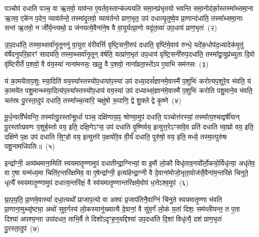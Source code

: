 पञ्चोप॑ दधाति पञ्च॒ वा ऋ॒तवो॒ याव॑न्त ए॒वर्तव॒स्तान्क॑ल्पयति समा॒नप्र॑भृतयो भवन्ति समा॒नोद॑र्का॒स्तस्मा᳚थ्समा॒ना ऋ॒तव॒ एके॑न प॒देन॒ व्याव॑र्तन्ते॒ तस्मा॑दृ॒तवो॒ व्याव॑र्तन्ते प्राण॒भृत॒ उप॑ दधात्यृ॒तुष्वे॒व प्रा॒णान्द॑धाति॒ तस्मा᳚थ्समा॒नाः सन्त॑ ऋ॒तवो॒ न जी᳚र्य॒न्त्यथो॒ प्र ज॑नयत्ये॒वैना॑ने॒ष वै वा॒युर्यत्प्रा॒णो यदृ॑त॒व्या॑ उप॒धाय॑ प्राण॒भृतः॑~(२)

उ॒प॒दधा॑ति॒ तस्मा॒थ्सर्वा॑नृ॒तूननु॑ वा॒युरा व॑रीवर्त्ति वृष्टि॒सनी॒रुप॑ दधाति॒ वृष्टि॑मे॒वाव॑ रुन्धे॒ यदे॑क॒धोप॑द॒ध्यादेक॑मृ॒तुं व॑र्\mbox{}षेदनुपरि॒हारꣳ॑ सादयति॒ तस्मा॒थ्सर्वा॑नृ॒तून् व॑र्\mbox{}षति॒ यत्प्रा॑ण॒भृत॑ उप॒धाय॑ वृष्टि॒सनी॑रुप॒दधा॑ति॒ तस्मा᳚द्वा॒युप्र॑च्युता दि॒वो वृ॑ष्टिरीर्ते प॒शवो॒ वै व॑य॒स्या॑ नाना॑मनसः॒ खलु॒ वै प॒शवो॒ नाना᳚व्रता॒स्ते॑\-ऽप ए॒वाभि सम॑नसः~(३)

यं का॒मये॑ताप॒शुः स्या॒दिति॑ वय॒स्या᳚स्तस्यो॑प॒धाया॑प॒स्या॑ उप॑ दध्या॒दसं᳚ज्ञानमे॒वास्मै॑ प॒शुभिः॑ करोत्यप॒शुरे॒व भ॑वति॒ यं का॒मये॑त पशु॒मान्थ्स्या॒दित्य॑प॒स्या᳚स्तस्यो॑प॒धाय॑ वय॒स्या॑ उप॑ दध्याथ्सं॒ज्ञान॑मे॒वास्मै॑ प॒शुभिः॑ करोति पशु॒माने॒व भ॑वति॒ चत॑स्रः पु॒रस्ता॒दुप॑ दधाति॒ तस्मा᳚च्च॒त्वारि॒ चक्षु॑षो रू॒पाणि॒ द्वे शु॒क्ले द्वे कृ॒ष्णे~(४)

मू॒र्ध॒न्वती᳚र्भवन्ति॒ तस्मा᳚त्पु॒रस्ता᳚न्मू॒र्धा पञ्च॒ दक्षि॑णाया॒ꣴ॒ श्रोण्या॒मुप॑ दधाति॒ पञ्चोत्त॑रस्यां॒ तस्मा᳚त्प॒श्चाद्वर्\mbox{}षी॑यान् पु॒रस्ता᳚त्प्रवणः प॒शुर्ब॒स्तो वय॒ इति॒ दक्षि॒णे\-ऽꣳस॒ उप॑ दधाति वृ॒ष्णिर्वय॒ इत्युत्त॒रे\-ऽꣳसा॑वे॒व प्रति॑ दधाति व्या॒घ्रो वय॒ इति॒ दक्षि॑णे प॒क्ष उप॑ दधाति सि॒ꣳ॒हो वय॒ इत्युत्त॑रे प॒क्षयो॑रे॒व वी॒र्यं॑ दधाति॒ पुरु॑षो॒ वय॒ इति॒ मध्ये॒ तस्मा॒त्पुरु॑षः पशू॒नामधि॑\-पतिः॥~(५)

{\anuvakamend[{कॢप्त्या॑ उप॒धाय॑ प्राण॒भृतः॒ सम॑नसः कृ॒ष्णे पुरु॑षो॒ वय॒ इति॒ पञ्च॑ च}]}%

इन्द्रा᳚ग्नी॒ अव्य॑थमाना॒मिति॑ स्वयमातृ॒ण्णामुप॑ दधातीन्द्रा॒ग्निभ्यां॒ वा इ॒मौ लो॒कौ विधृ॑ताव॒नयो᳚र्लो॒कयो॒र्विधृ॑त्या॒ अधृ॑तेव॒ वा ए॒षा यन्म॑ध्य॒मा चिति॑र॒न्तरि॑क्षमिव॒ वा ए॒षेन्द्रा᳚ग्नी॒ इत्या॑हेन्द्रा॒ग्नी वै दे॒वाना॑मोजो॒भृता॒वोज॑सै॒वैना॑\-म॒न्तरि॑क्षे चिनुते॒ धृत्यै᳚ स्वयमातृ॒ण्णामुप॑ दधात्य॒न्तरि॑क्षं॒ वै स्व॑यमातृ॒ण्णान्तरि॑क्षमे॒वोप॑ ध॒त्ते\-ऽश्व॒मुप॑~(६)

घ्रा॒प॒य॒ति॒ प्रा॒णमे॒वास्यां᳚ दधा॒त्यथो᳚ प्राजाप॒त्यो वा अश्वः॑ प्र॒जा\-प॑तिनै॒वाग्निं चि॑नुते स्वयमातृ॒ण्णा भ॑वति प्रा॒णाना॒मुथ्सृ॑ष्ट्या॒ अथो॑ सुव॒र्गस्य॑ लो॒कस्यानु॑ख्यात्यै दे॒वानां॒ वै सु॑व॒र्गं लो॒कं य॒तां दिशः॒ सम॑व्लीयन्त॒ त ए॒ता दिश्या॑ अपश्य॒न्ता उपा॑दधत॒ ताभि॒र्वै ते दिशो॑\-ऽदृꣳह॒न्॒यद्दिश्या॑ उप॒दधा॑ति दि॒शां विधृ॑त्यै॒ दश॑ प्राण॒भृतः॑ पु॒रस्ता॒दुप॑~(७)

